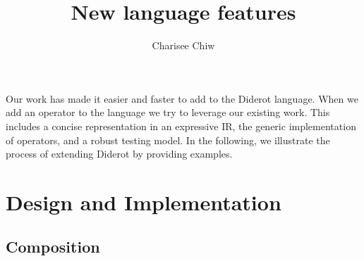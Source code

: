 \documentclass{article}
\title{New language features}
\author{Charisee Chiw}
\begin{document}
\maketitle 
Our work has made it easier and faster to add to the Diderot language.
When we add an operator to the language we try to leverage our existing work.
This includes a concise representation in an expressive IR, the generic implementation of operators, and a robust testing model.
In the following, we illustrate the process of extending Diderot by providing examples.

\section{Design and Implementation}
  \subsection{Composition}










 
\end{document}
